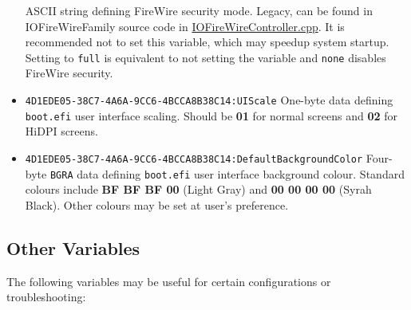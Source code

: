 \documentclass[]{article}
\makeatletter
\renewcommand{\label}[1]{%
\zref@wrapper@immediate{\oldlabel{#1}}}  %
\makeatother
\begin{document}
\begin{itemize}
  \break
  ASCII string defining FireWire security mode. Legacy, can be found in IOFireWireFamily
  source code in
  \href{https://opensource.apple.com/source/IOFireWireFamily/IOFireWireFamily-473/IOFireWireFamily.kmodproj/IOFireWireController.cpp.auto.html}{IOFireWireController.cpp}.
  It is recommended not to set this variable, which may speedup system startup. Setting to
  \texttt{full} is equivalent to not setting the variable and \texttt{none} disables
  FireWire security.
 \item
  \texttt{4D1EDE05-38C7-4A6A-9CC6-4BCCA8B38C14:UIScale}
  \break
  One-byte data defining \texttt{boot.efi} user interface scaling. Should be \textbf{01} for normal
  screens and \textbf{02} for HiDPI screens.
 \item
  \texttt{4D1EDE05-38C7-4A6A-9CC6-4BCCA8B38C14:DefaultBackgroundColor}
  \break
  Four-byte \texttt{BGRA} data defining \texttt{boot.efi} user interface background colour.
  Standard colours include \textbf{BF BF BF 00} (Light Gray) and \textbf{00 00 00 00}
  (Syrah Black). Other colours may be set at user's preference.
\end{itemize}

\subsection{Other Variables}\label{nvramvarsother}

The following variables may be useful for certain configurations or
troubleshooting:
\end{document}
